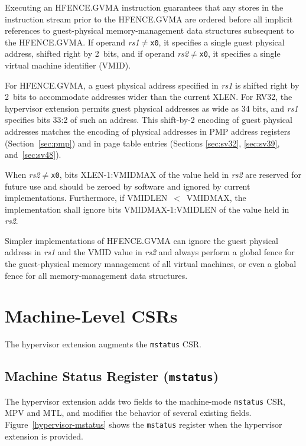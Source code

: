Executing an HFENCE.GVMA instruction guarantees that any stores in the
instruction stream prior to the HFENCE.GVMA are ordered before all implicit
references to guest-physical memory-management data structures subsequent to
the HFENCE.GVMA.
If operand {\em rs1}$\neq${\tt x0}, it specifies a single guest physical
address, shifted right by 2~bits, and if operand {\em rs2}$\neq${\tt x0}, it
specifies a single virtual machine identifier (VMID).

\begin{commentary}
For HFENCE.GVMA, a guest physical address specified in {\em rs1} is shifted
right by 2~bits to accommodate addresses wider than the current XLEN.
For RV32, the hypervisor extension permits guest physical addresses as wide as
34 bits, and {\em rs1} specifies bits 33:2 of such an address.
This shift-by-2 encoding of guest physical addresses matches the encoding of
physical addresses in PMP address registers (Section~\ref{sec:pmp}) and in page
table entries (Sections \ref{sec:sv32}, \ref{sec:sv39}, and~\ref{sec:sv48}).
\end{commentary}

When {\em rs2}$\neq${\tt x0}, bits XLEN-1:VMIDMAX of the value held in {\em
rs2} are reserved for future use and should be zeroed by software and ignored
by current implementations.
Furthermore, if VMIDLEN~$<$~VMIDMAX, the implementation shall ignore bits
VMIDMAX-1:VMIDLEN of the value held in {\em rs2}.

\begin{commentary}
Simpler implementations of HFENCE.GVMA can ignore the guest physical address in
{\em rs1} and the VMID value in {\em rs2} and always perform a global fence for
the guest-physical memory management of all virtual machines, or even a global
fence for all memory-management data structures.
\end{commentary}

\section{Machine-Level CSRs}

The hypervisor extension augments the {\tt mstatus} CSR.

\subsection{Machine Status Register ({\tt mstatus})}

The hypervisor extension adds two fields to the machine-mode {\tt mstatus} CSR,
MPV and MTL,
and modifies the behavior of several existing fields.
Figure~\ref{hypervisor-mstatus} shows the {\tt mstatus} register when the
hypervisor extension is provided.


